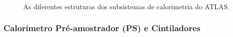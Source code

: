 \begin{figure}[ht!]
\begin{center}
        \hspace{0.01\textwidth}
         \\
        
    \end{center}
    \caption[As diferentes estruturas dos subsistemas de calorimetria do ATLAS]{As diferentes estruturas dos subsistemas de calorimetria do ATLAS.}
    
\end{figure}


\subsubsection{Calorímetro Pré-amostrador (PS) e Cintiladores}
\label{par:cal_ps}


